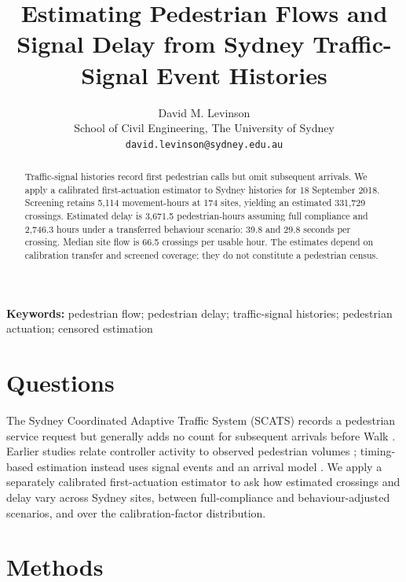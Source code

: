 \documentclass[11pt]{article}
\title{\textbf{Estimating Pedestrian Flows and Signal Delay from Sydney Traffic-Signal Event Histories}}
\author{David M. Levinson\\
\small School of Civil Engineering, The University of Sydney\\
\small \texttt{david.levinson@sydney.edu.au}}
\date{}
\begin{document}
\maketitle



\begin{abstract}

Traffic-signal histories record first pedestrian calls but omit subsequent arrivals. We apply a calibrated first-actuation estimator to Sydney histories for 18 September 2018. Screening retains 5,114 movement-hours at 174 sites, yielding an estimated 331,729 crossings. Estimated delay is 3,671.5 pedestrian-hours assuming full compliance and 2,746.3 hours under a transferred behaviour scenario: 39.8 and 29.8 seconds per crossing. Median site flow is 66.5 crossings per usable hour. The estimates depend on calibration transfer and screened coverage; they do not constitute a pedestrian census.

\end{abstract}

\noindent\textbf{Keywords:} pedestrian flow; pedestrian delay; traffic-signal histories; pedestrian actuation; censored estimation

\section{Questions}

The Sydney Coordinated Adaptive Traffic System (SCATS) records a pedestrian service request but generally adds no count for subsequent arrivals before Walk \citep{scats2026whoWeAre}. Earlier studies relate controller activity to observed pedestrian volumes \citep{singleton2021pedestrianSignalCounts,kothuri2024activeTransportationCounts,saheli2026pedestrianVolumes}; timing-based estimation instead uses signal events and an arrival model \citep{liWu2021midblockVolume}. We apply a separately calibrated first-actuation estimator \citep{levinson2026firstActuationCalibration} to ask how estimated crossings and delay vary across Sydney sites, between full-compliance and behaviour-adjusted scenarios, and over the calibration-factor distribution.

\section{Methods}
\end{document}
